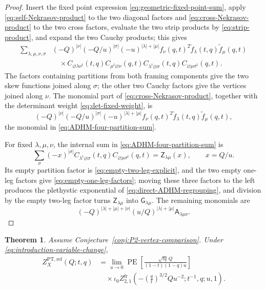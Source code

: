 \documentclass{amsart}
\newtheorem{theorem}{Theorem}
\theoremstyle{definition}
\numberwithin{equation}{section}
\newcommand{\PE}{\operatorname{PE}}
\begin{document}
\begin{proof}
Insert the fixed point expression \eqref{eq:geometric-fixed-point-sum}, apply \eqref{eq:self-Nekrasov-product} to the two diagonal factors and \eqref{eq:cross-Nekrasov-product} to the two cross factors, evaluate the two strip products by \eqref{eq:strip-product}, and expand the two Cauchy products; this gives
\begin{equation}
\begin{aligned}
 \sum_{\lambda,\mu,\nu,\sigma}
 &(-Q)^{|\nu|}(-Q/u)^{|\sigma|}
 (-u)^{|\lambda|+|\mu|}
 f_\nu(q,t)^2
 \widetilde f_\lambda(t,q)\widetilde f_\mu(q,t)\\
 &\quad\times
 C_{\varnothing\lambda\nu^t}(t,q)
 C_{\mu^t\varnothing\nu}(q,t)
 C_{\lambda^t\varnothing\sigma}(t,q)
 C_{\varnothing\mu\sigma^t}(q,t).
\end{aligned}
\label{eq:ADHM-four-partition-sum}
\end{equation}
The factors containing partitions from both framing components give the two skew functions joined along \(\sigma\); the other two Cauchy factors give the vertices joined along \(\nu\).  The monomial part of \eqref{eq:cross-Nekrasov-product}, together with the determinant weight \eqref{eq:det-fixed-weight}, is
\[
 (-Q)^{|\nu|}(-Q/u)^{|\sigma|}
 (-u)^{|\lambda|+|\mu|}
 f_\nu(q,t)^2\widetilde f_\lambda(t,q)
 \widetilde f_\mu(q,t),
\]
the monomial in \eqref{eq:ADHM-four-partition-sum}.

For fixed \(\lambda,\mu,\nu\), the internal sum in \eqref{eq:ADHM-four-partition-sum} is
\[
 \sum_\sigma(-x)^{|\sigma|}
 C_{\lambda^t\varnothing\sigma}(t,q)
 C_{\varnothing\mu\sigma^t}(q,t)
 =\mathsf Z_{\lambda\mu}(x),
 \qquad x=Q/u.
\]
Its empty partition factor is \eqref{eq:empty-two-leg-explicit}, and the two empty one-leg factors give \eqref{eq:empty-one-leg-factors}; moving these three factors to the left produces the plethystic exponential of \eqref{eq:direct-ADHM-regrouping}, and division by the empty two-leg factor turns \(\mathsf Z_{\lambda\mu}\) into \(\mathsf G_{\lambda\mu}\).  The remaining monomials are
\[
 (-Q)^{|\lambda|+|\mu|+|\nu|}
 (u/Q)^{|\lambda|+|\mu|}
 \mathsf A_{\lambda\mu\nu}.
\]
\end{proof}

\begin{theorem}
\label{thm:P2-PT-ADHM}
Assume Conjecture~\ref{conj:P2-vertex-comparison}.  Under \eqref{eq:introduction-variable-change},
\begin{equation}
\begin{aligned}
 Z_{X}^{\mathrm{PT},\mathrm{ref}}(Q;t,q)
 &=\lim_{u\to0}
 \PE\left[
 \frac{\sqrt{tq}\,Q}{(1-t)(1-q)u}
 \right]\\[-1pt]
 &\quad\times
 \iota_0 Z_{2,1}^{\mathrm{fr}}
 \left(-\left(\frac qt\right)^{3/2}Qu^{-2};t^{-1},q;u,1\right).
\end{aligned}
\label{eq:P2-PT-ADHM}
\end{equation}
\end{theorem}
\end{document}
